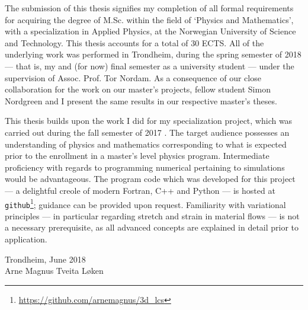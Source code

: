 The submission of this thesis signifies my completion of all formal
requirements for acquiring the degree of M.Sc. within the field of `Physics and
Mathematics', with a specialization in Applied Physics, at the Norwegian
University of Science and Technology. This thesis accounts for a total of 30
ECTS. All of the underlying work was performed in Trondheim, during the spring
semester of 2018 --- that is, my  and (for now) final semester as a
university student --- under the supervision of Assoc. Prof. Tor Nordam. As a
consequence of our close collaboration for the work on our master's projects,
fellow student Simon Nordgreen and I present the same results in our respective
master's theses.

This thesis builds upon the work I did for my specialization project, which was
carried out during the fall semester of 2017 \parencite{loken2017sensitivity}.
The target audience possesses an understanding of physics and mathematics
corresponding to what is expected prior to the enrollment in a master's level
physics program. Intermediate proficiency with regards to programming numerical
pertaining to simulations would be advantageous. The program code which was
developed for this project --- a delightful creole of modern Fortran, C++ and
Python --- is hosted at
\texttt{github}\footnote{\url{https://github.com/arnemagnus/3d_lcs}}; guidance
can be provided upon request. Familiarity with variational principles --- in
particular regarding stretch and strain in material flows --- is not a
necessary prerequisite, as all advanced concepts are explained in detail prior
to application.


\begin{minipage}[t]{\textwidth}
    \begin{flushright}
    Trondheim, June 2018\\
    Arne Magnus Tveita Løken
    \end{flushright}
\end{minipage}
